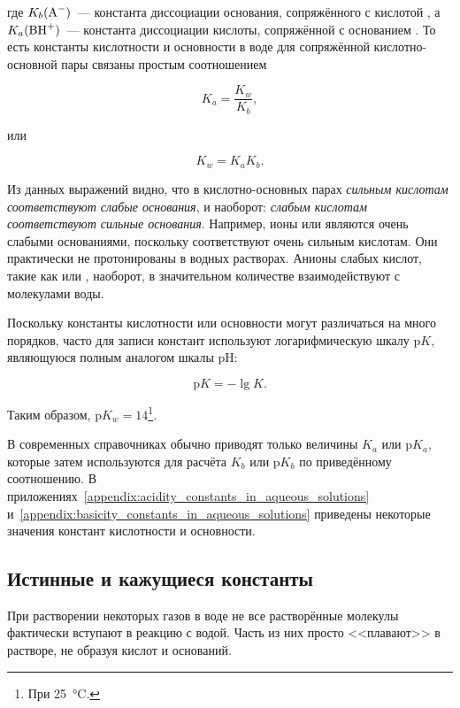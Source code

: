 где $K_b(\ce{A^-})$~--- константа диссоциации основания, сопряжённого с кислотой , а $K_a(\ce{BH^+})$~--- константа диссоциации кислоты, сопряжённой с основанием . То есть константы кислотности и основности в воде для сопряжённой кислотно-основной пары связаны простым соотношением

\begin{equation*}
    \boxed{K_a = \frac{K_w}{K_b}},
\end{equation*}

или

\begin{equation*}
    \boxed{K_w = K_aK_b}.
\end{equation*}

Из данных выражений видно, что в кислотно-основных парах \emph{сильным кислотам соответствуют слабые основания}, и наоборот: \emph{слабым кислотам соответствуют сильные основания}. Например, ионы  или  являются очень слабыми основаниями, поскольку соответствуют очень сильным кислотам. Они практически не протонированы в водных растворах. Анионы слабых кислот, такие как  или , наоборот, в значительном количестве взаимодействуют с молекулами воды.

Поскольку константы кислотности или основности могут различаться на много порядков, часто для записи констант используют логарифмическую шкалу $\text{p}K$, являющуюся полным аналогом шкалы pH:

\begin{equation*}
    \text{p}K = -\lg K.
\end{equation*}

Таким образом, $\text{p}K_w = 14$\footnote{При \qty{25}{\degreeCelsius}.}.

В современных справочниках обычно приводят только величины $K_a$ или $\text{p}K_a$, которые затем используются для расчёта $K_b$ или $\text{p}K_b$ по приведённому соотношению. В приложениях~\ref{appendix:acidity_constants_in_aqueous_solutions} и~\ref{appendix:basicity_constants_in_aqueous_solutions} приведены некоторые значения констант кислотности и основности.

\subsection*{Истинные и кажущиеся константы}

При растворении некоторых газов в воде не все растворённые молекулы фактически вступают в реакцию с водой. Часть из них просто <<плавают>> в растворе, не образуя кислот и оснований.

